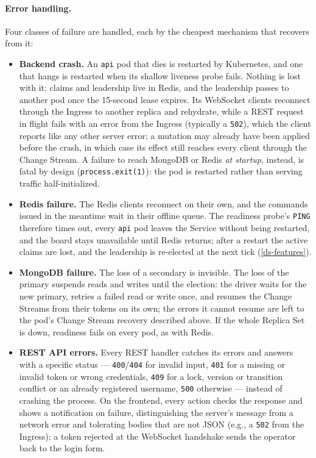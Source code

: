 \documentclass{scrartcl}
\begin{document}
\paragraph{Error handling.} Four classes of failure are handled, each by the cheapest mechanism that recovers from it:
%
\begin{itemize}
  \item \textbf{Backend crash.} An \texttt{api} pod that dies is restarted by Kubernetes, and one that hangs is restarted when its shallow liveness probe fails. Nothing is lost with it: claims and leadership live in Redis, and the leadership passes to another pod once the 15-second lease expires. Its WebSocket clients reconnect through the Ingress to another replica and rehydrate, while a REST request in flight fails with an error from the Ingress (typically a \texttt{502}), which the client reports like any other server error; a mutation may already have been applied before the crash, in which case its effect still reaches every client through the Change Stream. A failure to reach MongoDB or Redis \emph{at startup}, instead, is fatal by design (\texttt{process.exit(1)}): the pod is restarted rather than serving traffic half-initialized.
  \item \textbf{Redis failure.} The Redis clients reconnect on their own, and the commands issued in the meantime wait in their offline queue. The readiness probe's \texttt{PING} therefore times out, every \texttt{api} pod leaves the Service without being restarted, and the board stays unavailable until Redis returns; after a restart the active claims are lost, and the leadership is re-elected at the next tick (\cref{ds-features}).
  \item \textbf{MongoDB failure.} The loss of a secondary is invisible. The loss of the primary suspends reads and writes until the election: the driver waits for the new primary, retries a failed read or write once, and resumes the Change Streams from their tokens on its own; the errors it cannot resume are left to the pod's Change Stream recovery described above. If the whole Replica Set is down, readiness fails on every pod, as with Redis.
  \item \textbf{REST API errors.} Every REST handler catches its errors and answers with a specific status --- \texttt{400}/\texttt{404} for invalid input, \texttt{401} for a missing or invalid token or wrong credentials, \texttt{409} for a lock, version or transition conflict or an already registered username, \texttt{500} otherwise --- instead of crashing the process. On the frontend, every action checks the response and shows a notification on failure, distinguishing the server's message from a network error and tolerating bodies that are not JSON (e.g., a \texttt{502} from the Ingress); a token rejected at the WebSocket handshake sends the operator back to the login form.
\end{itemize}
 
\end{document}
